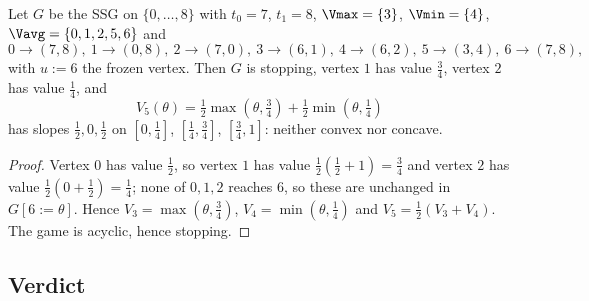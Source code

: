 \begin{proposition}\label{prop:bv-neither}
Let $G$ be the SSG on $\{0,\dots,8\}$ with $t_0=7$, $t_1=8$,
$\Vmax=\{3\}$, $\Vmin=\{4\}$, $\Vavg=\{0,1,2,5,6\}$ and
\[
 0\to(7,8),\ 1\to(0,8),\ 2\to(7,0),\ 3\to(6,1),\ 4\to(6,2),\ 5\to(3,4),\ 6\to(7,8),
\]
with $u:=6$ the frozen vertex. Then $G$ is stopping, vertex $1$ has value
$\tfrac34$, vertex $2$ has value $\tfrac14$, and
\[
  V_5(\theta)=\tfrac12\max(\theta,\tfrac34)+\tfrac12\min(\theta,\tfrac14)
\]
has slopes $\tfrac12,0,\tfrac12$ on $[0,\tfrac14]$, $[\tfrac14,\tfrac34]$,
$[\tfrac34,1]$: neither convex nor concave.
\end{proposition}

\begin{proof}
Vertex $0$ has value $\tfrac12$, so vertex $1$ has value
$\tfrac12(\tfrac12+1)=\tfrac34$ and vertex $2$ has value
$\tfrac12(0+\tfrac12)=\tfrac14$; none of $0,1,2$ reaches $6$, so these are
unchanged in $G[6{:=}\theta]$. Hence $V_3=\max(\theta,\tfrac34)$,
$V_4=\min(\theta,\tfrac14)$ and $V_5=\tfrac12(V_3+V_4)$. The game is
acyclic, hence stopping.
\end{proof}

\subsection{Verdict}

